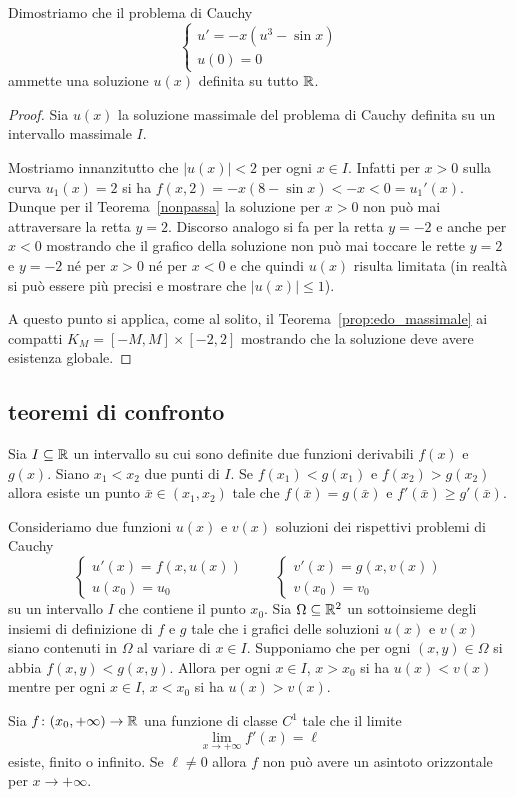 \begin{example}
Dimostriamo che il problema di Cauchy
\[
\begin{cases}
	u' = -x(u^3 - \sin x) \\
	u(0) = 0
\end{cases}
\]
ammette una soluzione $u(x)$ definita su tutto ${\mathbb R}$.
\end{example}
%
\begin{proof}
Sia $u(x)$ la soluzione massimale del problema di Cauchy
definita su un intervallo massimale $I$.

Mostriamo innanzitutto che $\vert u(x) \vert < 2$ per ogni $x\in
I$.
Infatti per $x>0$ sulla curva $u_1(x)=2$ si ha $f(x,2) = -x
(8-\sin x) < -x < 0 = u_1'(x)$.
Dunque per il Teorema~\ref{nonpassa} la
soluzione per $x>0$ non può mai attraversare la retta
$y=2$.
Discorso analogo si fa per la retta $y=-2$ e anche per $x<0$
mostrando che il grafico della  soluzione non può mai toccare le
rette $y=2$ e $y=-2$ né per $x>0$ né per $x<0$
e che quindi $u(x)$ risulta limitata (in realtà si
può essere più precisi e mostrare che $\vert u(x)\vert \le 1$).

A questo punto si applica, come al solito, il Teorema~\ref{prop:edo_massimale} ai
compatti $K_M=[-M,M]\times[-2,2]$ mostrando che la soluzione deve
avere esistenza globale.
\end{proof}

\subsection{teoremi di confronto}

\begin{theorem}
Sia $I\subseteq {\mathbb R}$ un intervallo su cui sono definite due funzioni derivabili
$f(x)$ e $g(x)$.
Siano $x_1<x_2$ due punti di $I$. Se $f(x_1)<g(x_1)$ e $f(x_2)>g(x_2)$
allora esiste un punto $\bar x \in (x_1,x_2)$ tale che $f(\bar
x)=g(\bar x)$ e $f'(\bar x)\ge g'(\bar x)$.
\end{theorem}

\begin{theorem}
Consideriamo due funzioni $u(x)$ e $v(x)$ soluzioni dei rispettivi
problemi di Cauchy
\[
\begin{cases}
  u'(x)  = f(x,u(x))\\
  u(x_0) = u_0
\end{cases}
\qquad
\begin{cases}
  v'(x) = g(x,v(x))\\
  v(x_0) = v_0
\end{cases}
\]
su un intervallo $I$ che contiene il punto $x_0$.
Sia $\Omega\subseteq {\mathbb R}^2$ un sottoinsieme degli insiemi di definizione
di $f$ e $g$ tale che i grafici delle soluzioni $u(x)$ e $v(x)$ siano
contenuti in $\Omega$ al variare di $x\in I$.
Supponiamo che per ogni $(x,y)\in\Omega$ si abbia $f(x,y)<g(x,y)$.
Allora per ogni $x\in I$, $x> x_0$ si ha $u(x)< v(x)$ mentre per ogni
$x\in I$, $x<x_0$ si ha $u(x)>v(x)$.
\end{theorem}

\begin{theorem}
Sia $f\colon (x_0,+\infty)\to {\mathbb R}$ una funzione di classe
$C^1$ tale
che il limite
\[
  \lim_{x\to +\infty} f'(x) = \ell
\]
esiste, finito o infinito. Se $\ell\neq 0$ allora $f$ non può avere
un asintoto orizzontale per $x\to +\infty$.
\end{theorem}
